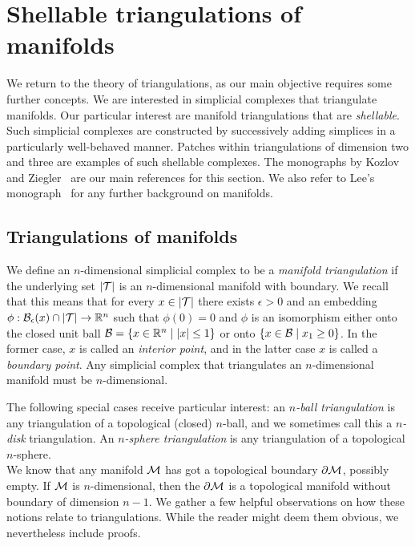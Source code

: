 \documentclass[12pt,a4paper]{article}
\begin{document}
\section{Shellable triangulations of manifolds}\label{section:advancedtriangulations}

We return to the theory of triangulations,
as our main objective requires some further concepts.
We are interested in simplicial complexes that triangulate manifolds. 
Our particular interest are manifold triangulations that are \emph{shellable}.
Such simplicial complexes are constructed by successively adding simplices in a particularly well-behaved manner. 
Patches within triangulations of dimension two and three are examples of such shellable complexes. 
The monographs by Kozlov~\cite{kozlov2008combinatorial} and Ziegler~\cite{ziegler2012lectures} are our main references for this section. 
We also refer to Lee's monograph~\cite{lee2011topological} for any further background on manifolds. 

\subsection{Triangulations of manifolds}

We define an $n$-dimensional simplicial complex to be a \emph{manifold triangulation} if the underlying set $\left| {\mathcal T} \right|$ is an $n$-dimensional manifold with boundary.
We recall that this means that for every $x \in \left| {\mathcal T} \right|$
there exists $\epsilon > 0$ and an embedding $\phi : {\mathcal B}_\epsilon(x) \cap \left| {\mathcal T} \right| \rightarrow {\mathbb R}^{n}$
such that $\phi(0) = 0$ and $\phi$ is an isomorphism either onto the closed unit ball $\calB = \{ x \in \bbR^{n} \suchthat |x| \leq 1 \}$
or onto $\{ x \in \calB \suchthat x_1 \geq 0 \}$.
In the former case, $x$ is called an \emph{interior point}, and in the latter case $x$ is called a \emph{boundary point}. 
Any simplicial complex that triangulates an $n$-dimensional manifold must be $n$-dimensional.

The following special cases receive particular interest:
an \textit{$n$-ball triangulation} is any triangulation of a topological (closed) $n$-ball,
and we sometimes call this a \textit{$n$-disk} triangulation.
An \textit{$n$-sphere triangulation} is any triangulation of a topological $n$-sphere. 
\\


We know that any manifold ${\mathcal M}$ has got a topological boundary $\partial{\mathcal M}$, possibly empty. 
If ${\mathcal M}$ is $n$-dimensional, then the $\partial{\mathcal M}$ is a topological manifold without boundary of dimension $n-1$. 
We gather a few helpful observations on how these notions relate to triangulations.
While the reader might deem them obvious, we nevertheless include proofs. 
\end{document}
